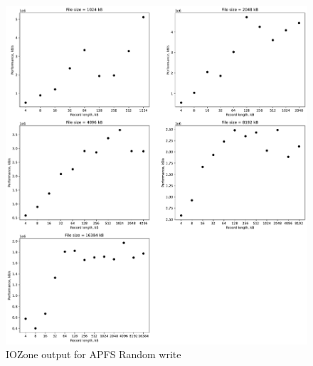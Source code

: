 \begin{figure}[!htb]
	\label{fig:app_bench_apfs_rnd_read}
	\begin{center}
		\includegraphics[width=1.0\textwidth]{figures/benchmarking/local/Random write.pdf}
	\end{center}
	\caption{IOZone output for APFS Random write}
\end{figure}

